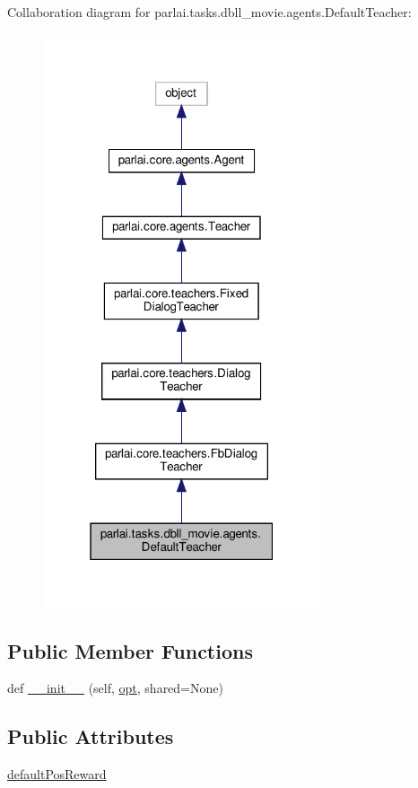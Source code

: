 Collaboration diagram for parlai.\+tasks.\+dbll\+\_\+movie.\+agents.\+Default\+Teacher\+:
\nopagebreak
\begin{figure}[H]
\begin{center}
\leavevmode
\includegraphics[width=232pt]{classparlai_1_1tasks_1_1dbll__movie_1_1agents_1_1DefaultTeacher__coll__graph}
\end{center}
\end{figure}
\subsection*{Public Member Functions}
\begin{DoxyCompactItemize}
\item 
def \hyperlink{classparlai_1_1tasks_1_1dbll__movie_1_1agents_1_1DefaultTeacher_a66c1dbd7bb3e1b49e3c145235f1fffa0}{\+\_\+\+\_\+init\+\_\+\+\_\+} (self, \hyperlink{classparlai_1_1core_1_1teachers_1_1FbDialogTeacher_af7a9ec497b9cd0292d7b8fa220da7c28}{opt}, shared=None)
\end{DoxyCompactItemize}
\subsection*{Public Attributes}
\begin{DoxyCompactItemize}
\item 
\hyperlink{classparlai_1_1tasks_1_1dbll__movie_1_1agents_1_1DefaultTeacher_a8349f6694fcf25ac83d5f0972d99fede}{default\+Pos\+Reward}
\end{DoxyCompactItemize}
